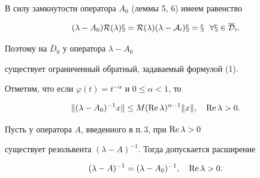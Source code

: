 \begin{pf}
В силу замкнутости оператора $A_{0}$ (леммы 5, 6) имеем равенство


$$


(\lambda-A_{0}) \cal{R}(\lambda)x=


\cal{R}(\lambda)(\lambda-A_{0})x=x \ \ \forall x\in \overline{D}_{0}.


$$


Поэтому на $\overline{D}_{0}$ у оператора $\lambda-A_{0}$


существует ограниченный обратный,  задаваемый формулой (1).


\end{pf}





Отметим, что если $\varphi(t)=t^{-\alpha}$ и $0\leq \alpha< 1$, то


$$


\| (\lambda-A_{0})^{-1}x\| \leq M(\re \lambda)^{\alpha-1}


\| x \|, \quad \re \lambda > 0.


$$








\begin{lem}


Пусть у оператора $A$, введенного в п.\,$3$, при $\operatorname{Re} \lambda > 0$


существует резольвента $(\lambda-A)^{-1}$. Тогда допускается расширение


$$


(\lambda-A)^{-1}=(\lambda-A_{0})^{-1}, \quad \re \lambda > 0.


$$


\end{lem}








